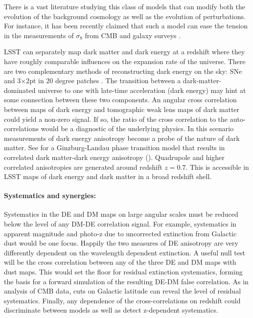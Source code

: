 \documentclass[modern,linenumbers]{aastex62}
\begin{document}
There is a vast literature studying this class of models that can modify both the evolution of the 
background cosmology as well as the evolution of perturbations. For instance, it has been recently claimed
that such a model can ease the tension in the measurements of $\sigma_8$ from CMB and galaxy surveys 
\citep{Barros:2018efl}.

LSST can separately map dark matter and dark energy at a redshift where they have roughly comparable influences on the expansion rate of the universe. 
There are two complementary methods of reconstructing dark energy on the sky: SNe and 3$\times$2pt in 20 degree patches \citep[Figure 15.9 in ][]{0912.0201}.
The transition between a dark-matter-dominated universe to one with late-time acceleration (dark energy) may hint at some connection between these two components. 
An angular cross correlation between maps of dark energy and tomographic weak lens maps of dark matter could yield a non-zero signal.  
If so, the ratio of the cross correlation to the auto-correlations would be a diagnostic of the underlying physics. 
In this scenario measurements of dark energy anisotropy become a probe of the nature of dark matter. 
See \cite{1810.11007} for a Ginzburg-Landau phase transition model that results in correlated dark matter-dark energy anisotropy (). 
Quadrupole and higher correlated anisotropies are generated around redshift $z=0.7$.  
This is accessible in LSST maps of dark energy and dark matter in a broad redshift shell.

\paragraph{Systematics and synergies:}

Systematics in the DE and DM maps on large angular scales must be reduced below the level of any DM-DE correlation signal.  
For example, systematics in apparent magnitude and photo-z due to uncorrected extinction from Galactic dust would be one focus. 
Happily the two measures of DE anisotropy are very differently dependent on the wavelength dependent extinction. 
A useful null test will be the cross correlation between any of the three DE and DM maps with dust maps.  
This would set the floor for residual extinction systematics, forming the basis for a forward simulation of the resulting DE-DM false correlation. 
As in analysis of CMB data, cuts on Galactic latitude can reveal the level of residual systematics. 
Finally, any dependence of the cross-correlations on redshift could discriminate between models as well as detect z-dependent systematics.
\end{document}

